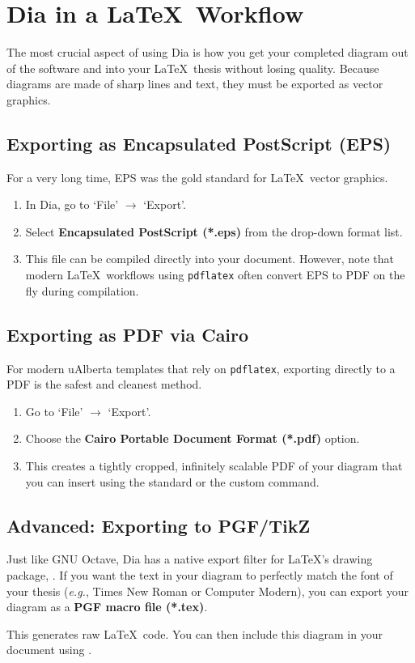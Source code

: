 	\section{Dia in a \LaTeX\ Workflow}
		The most crucial aspect of using Dia is how you get your completed diagram out of the software and into your \LaTeX\ thesis without losing quality. 
		Because diagrams are made of sharp lines and text, they must be exported as vector graphics.

		\subsection{Exporting as Encapsulated PostScript (EPS)}
			For a very long time, EPS was the gold standard for \LaTeX\ vector graphics. 
			\begin{enumerate}
				\item In Dia, go to `File' \(\rightarrow\) `Export'.
				\item Select \textbf{Encapsulated PostScript (*.eps)} from the drop-down format list.
				\item This file can be compiled directly into your document. 
					However, note that modern \LaTeX\ workflows using \texttt{pdflatex} often convert EPS to PDF on the fly during compilation.
			\end{enumerate}

		\subsection{Exporting as PDF via Cairo}
			For modern uAlberta templates that rely on \texttt{pdflatex}, exporting directly to a PDF is the safest and cleanest method.
			\begin{enumerate}
				\item Go to `File' \(\rightarrow\) `Export'.
				\item Choose the \textbf{Cairo Portable Document Format (*.pdf)} option.
				\item This creates a tightly cropped, infinitely scalable PDF of your diagram that you can insert using the standard  or the custom  command.
			\end{enumerate}

		\subsection{Advanced: Exporting to PGF/TikZ}
			Just like GNU Octave, Dia has a native export filter for \LaTeX's drawing package, . 
			If you want the text in your diagram to perfectly match the font of your thesis (\textit{e.g.}, Times New Roman or Computer Modern), you can export your diagram as a \textbf{PGF macro file (*.tex)}. 
			
			This generates raw \LaTeX\ code. 
			You can then include this diagram in your document using . 
